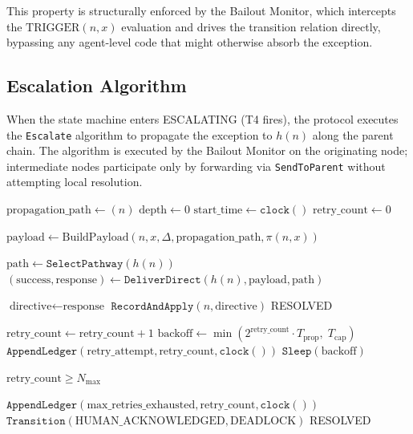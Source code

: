 This property is structurally enforced by the Bailout Monitor, which intercepts the $\text{TRIGGER}(n, x)$ evaluation and drives the transition relation directly, bypassing any agent-level code that might otherwise absorb the exception.

\subsection{Escalation Algorithm}\label{sec:escalation-algorithm}

When the state machine enters ESCALATING (T4 fires), the protocol executes the \texttt{Escalate} algorithm to propagate the exception to $h(n)$ along the parent chain. The algorithm is executed by the Bailout Monitor on the originating node; intermediate nodes participate only by forwarding via \texttt{SendToParent} without attempting local resolution.

\begin{algorithm}[htbp]
\caption{Bailout Escalation Algorithm for node $n$}
\label{alg:escalate}
\begin{algorithmic}
  \State $\text{propagation\_path} \leftarrow (n)$
  \State $\text{depth} \leftarrow 0$
  \State $\text{start\_time} \leftarrow \texttt{clock}()$
  \State $\text{retry\_count} \leftarrow 0$

  \State $\text{payload} \leftarrow \text{BuildPayload}(n, x, \Delta, \text{propagation\_path}, \pi(n,x))$

  \Repeat
    \State $\text{path} \leftarrow \texttt{SelectPathway}(h(n))$
    \State $(\text{success}, \text{response}) \leftarrow \texttt{DeliverDirect}(h(n), \text{payload}, \text{path})$

      \State $\text{directive} \leftarrow \text{response}$
      \State $\texttt{RecordAndApply}(n, \text{directive})$
      \State \Return RESOLVED
    \EndIf

    \State $\text{retry\_count} \leftarrow \text{retry\_count} + 1$
    \State $\text{backoff} \leftarrow \min(2^{\text{retry\_count}} \cdot T_{\text{prop}},\; T_{\text{cap}})$
    \State $\texttt{AppendLedger}(\text{retry\_attempt}, \text{retry\_count}, \texttt{clock}())$
    \State $\texttt{Sleep}(\text{backoff})$

  \Until $\text{retry\_count} \geq N_{\max}$

  \State $\texttt{AppendLedger}(\text{max\_retries\_exhausted}, \text{retry\_count}, \texttt{clock}())$
  \State $\texttt{Transition}(\text{HUMAN\_ACKNOWLEDGED}, \text{DEADLOCK})$
  \State \Return RESOLVED
\EndFunction
\end{algorithmic}
\end{algorithm}

